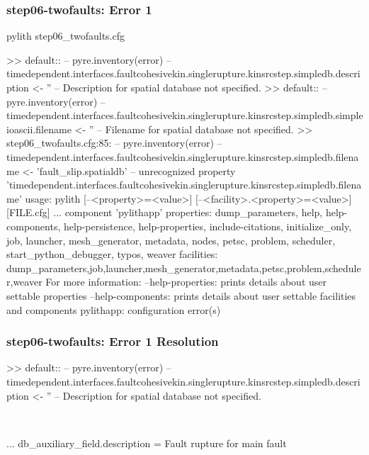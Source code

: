 \documentclass[aspectratio=169]{beamer}
\begin{document}
\begin{frame}[fragile]
  \frametitle{{\ttfamily step06-twofaults}: Error 1}

\begin{bashcode}
pylith step06_twofaults.cfg

 >> {default}::
 -- pyre.inventory(error)
 -- timedependent.interfaces.faultcohesivekin.singlerupture.kinsrcstep.simpledb.description <- ''
 -- Description for spatial database not specified.
 >> {default}::
 -- pyre.inventory(error)
 -- timedependent.interfaces.faultcohesivekin.singlerupture.kinsrcstep.simpledb.simpleioascii.filename <- ''
 -- Filename for spatial database not specified.
 >> step06_twofaults.cfg:85:
 -- pyre.inventory(error)
 -- timedependent.interfaces.faultcohesivekin.singlerupture.kinsrcstep.simpledb.filename <- 'fault_slip.spatialdb'
 -- unrecognized property 'timedependent.interfaces.faultcohesivekin.singlerupture.kinsrcstep.simpledb.filename'
usage: pylith [--<property>=<value>] [--<facility>.<property>=<value>] [FILE.cfg] ...
component 'pylithapp'
    properties: dump_parameters, help, help-components, help-persistence, help-properties, include-citations, initialize_only, job, launcher, mesh_generator, metadata, nodes, petsc, problem, scheduler, start_python_debugger, typos, weaver
    facilities: dump_parameters,job,launcher,mesh_generator,metadata,petsc,problem,scheduler,weaver
For more information:
  --help-properties: prints details about user settable properties
  --help-components: prints details about user settable facilities and components
pylithapp: configuration error(s)
\end{bashcode}

\end{frame}


\begin{frame}[t,fragile]
  \frametitle{{\ttfamily step06-twofaults}: Error 1 Resolution}

  \tserror
  \begin{bashcode}
    >> {default}::
    -- pyre.inventory(error)
    -- timedependent.interfaces.faultcohesivekin.singlerupture.kinsrcstep.simpledb.description <- ''
    -- Description for spatial database not specified.
  \end{bashcode}

  \pause\\[1pt]

  \begin{cfgcode}
    ...
    db_auxiliary_field.description = Fault rupture for main fault
  \end{cfgcode}

\end{frame}
\end{document}
